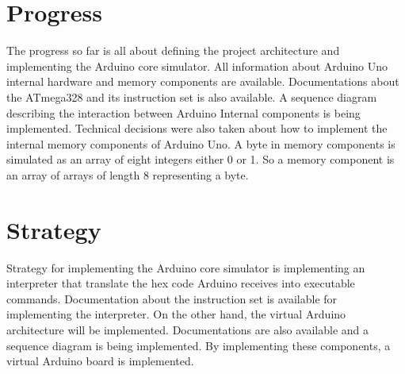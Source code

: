 \documentclass[12pt, a4paper]{report}
\begin{document}
\section{Progress}
The progress so far is all about defining the project architecture and implementing the Arduino core simulator. All information about Arduino Uno internal hardware and memory components are available. Documentations about the ATmega328 and its instruction set is also available. A sequence diagram describing the interaction between Arduino Internal components is being implemented. Technical decisions were also taken about how to implement the internal memory components of Arduino Uno. A byte in memory components is simulated as an array of eight integers either 0 or 1. So a memory component is an array of arrays of length 8 representing a byte.

\section{Strategy}
Strategy for implementing the Arduino core simulator is implementing an interpreter that translate the hex code Arduino receives into executable commands. Documentation about the instruction set is available for implementing the interpreter. On the other hand, the virtual Arduino architecture will be implemented. Documentations are also available and a sequence diagram is being implemented. By implementing these components, a virtual Arduino board is implemented.




\end{document}
